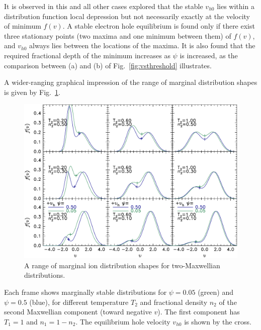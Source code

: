 \documentclass[pre]{revtex4-2}
\begin{document}
It is observed in this and all other cases explored that the stable
$v_{h0}$ lies within a distribution function local depression but not
necessarily exactly at the velocity of minimum $f(v)$.
A stable electron hole equilibrium is found only if there exist three
stationary points (two maxima and one minimum between them) of $f(v)$,
and $v_{h0}$ always lies between the locations of the maxima. It is
also found that the required fractional depth of the minimum increases
as $\psi$ is increased, as the comparison between (a) and (b) of Fig.\
\ref{fig:vsthreshold} illustrates.

A wider-ranging graphical impression of the range of marginal
distribution shapes is given by Fig.\ \ref{fig:shapes}.
\begin{figure}[htp]
  \centering
  \includegraphics[width=.8\hsize]{shapes}
  \caption{A range of marginal ion distribution shapes for two-Maxwellian
    distributions.}
  \label{fig:shapes}
\end{figure}
Each frame shows marginally stable distributions for $\psi=0.05$ (green) and
$\psi=0.5$ (blue), for different temperature $T_2$ and fractional
density $n_2$ of the second Maxwellian component (toward negative
$v$). The first component has $T_1=1$ and $n_1=1-n_2$. The equilibrium hole
velocity $v_{h0}$ is shown by the cross.
\end{document}
